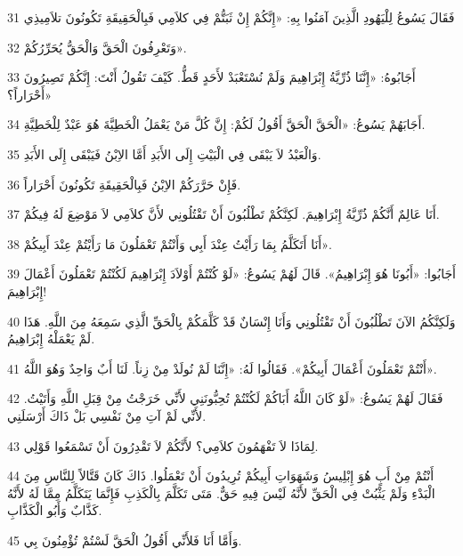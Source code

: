 \par 31 فَقَالَ يَسُوعُ لِلْيَهُودِ الَّذِينَ آمَنُوا بِهِ: «إِنَّكُمْ إِنْ ثَبَتُّمْ فِي كلاَمِي فَبِالْحَقِيقَةِ تَكُونُونَ تلاَمِيذِي
\par 32 وَتَعْرِفُونَ الْحَقَّ وَالْحَقُّ يُحَرِّرُكُمْ».
\par 33 أَجَابُوهُ: «إِنَّنَا ذُرِّيَّةُ إِبْرَاهِيمَ وَلَمْ نُسْتَعْبَدْ لأَحَدٍ قَطُّ. كَيْفَ تَقُولُ أَنْتَ: إِنَّكُمْ تَصِيرُونَ أَحْرَاراً؟»
\par 34 أَجَابَهُمْ يَسُوعُ: «الْحَقَّ الْحَقَّ أَقُولُ لَكُمْ: إِنَّ كُلَّ مَنْ يَعْمَلُ الْخَطِيَّةَ هُوَ عَبْدٌ لِلْخَطِيَّةِ.
\par 35 وَالْعَبْدُ لاَ يَبْقَى فِي الْبَيْتِ إِلَى الأَبَدِ أَمَّا الاِبْنُ فَيَبْقَى إِلَى الأَبَدِ.
\par 36 فَإِنْ حَرَّرَكُمْ الاِبْنُ فَبِالْحَقِيقَةِ تَكُونُونَ أَحْرَاراً.
\par 37 أَنَا عَالِمٌ أَنَّكُمْ ذُرِّيَّةُ إِبْرَاهِيمَ. لَكِنَّكُمْ تَطْلُبُونَ أَنْ تَقْتُلُونِي لأَنَّ كلاَمِي لاَ مَوْضِعَ لَهُ فِيكُمْ.
\par 38 أَنَا أَتَكَلَّمُ بِمَا رَأَيْتُ عِنْدَ أَبِي وَأَنْتُمْ تَعْمَلُونَ مَا رَأَيْتُمْ عِنْدَ أَبِيكُمْ».
\par 39 أَجَابُوا: «أَبُونَا هُوَ إِبْرَاهِيمُ». قَالَ لَهُمْ يَسُوعُ: «لَوْ كُنْتُمْ أَوْلاَدَ إِبْرَاهِيمَ لَكُنْتُمْ تَعْمَلُونَ أَعْمَالَ إِبْرَاهِيمَ!
\par 40 وَلَكِنَّكُمُ الآنَ تَطْلُبُونَ أَنْ تَقْتُلُونِي وَأَنَا إِنْسَانٌ قَدْ كَلَّمَكُمْ بِالْحَقِّ الَّذِي سَمِعَهُ مِنَ اللَّهِ. هَذَا لَمْ يَعْمَلْهُ إِبْرَاهِيمُ.
\par 41 أَنْتُمْ تَعْمَلُونَ أَعْمَالَ أَبِيكُمْ». فَقَالُوا لَهُ: «إِنَّنَا لَمْ نُولَدْ مِنْ زِناً. لَنَا أَبٌ وَاحِدٌ وَهُوَ اللَّهُ».
\par 42 فَقَالَ لَهُمْ يَسُوعُ: «لَوْ كَانَ اللَّهُ أَبَاكُمْ لَكُنْتُمْ تُحِبُّونَنِي لأَنِّي خَرَجْتُ مِنْ قِبَلِ اللَّهِ وَأَتَيْتُ. لأَنِّي لَمْ آتِ مِنْ نَفْسِي بَلْ ذَاكَ أَرْسَلَنِي.
\par 43 لِمَاذَا لاَ تَفْهَمُونَ كلاَمِي؟ لأَنَّكُمْ لاَ تَقْدِرُونَ أَنْ تَسْمَعُوا قَوْلِي.
\par 44 أَنْتُمْ مِنْ أَبٍ هُوَ إِبْلِيسُ وَشَهَوَاتِ أَبِيكُمْ تُرِيدُونَ أَنْ تَعْمَلُوا. ذَاكَ كَانَ قَتَّالاً لِلنَّاسِ مِنَ الْبَدْءِ وَلَمْ يَثْبُتْ فِي الْحَقِّ لأَنَّهُ لَيْسَ فِيهِ حَقٌّ. مَتَى تَكَلَّمَ بِالْكَذِبِ فَإِنَّمَا يَتَكَلَّمُ مِمَّا لَهُ لأَنَّهُ كَذَّابٌ وَأَبُو الْكَذَّابِ.
\par 45 وَأَمَّا أَنَا فَلأَنِّي أَقُولُ الْحَقَّ لَسْتُمْ تُؤْمِنُونَ بِي.
